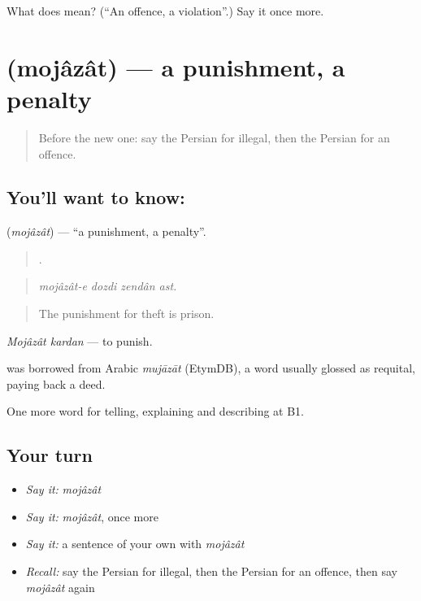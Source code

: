\begin{tcolorbox}[breakable,colback=teal!4,colframe=teal!35!black,title={Before you move on}]
What does  mean? (\textquotedblleft{}An offence, a violation\textquotedblright{}.) Say it once more.
\end{tcolorbox}
\section[\texorpdfstring{\fa{مجازات} (mojâzât)}{مجازات (mojâzât)}]{ (mojâzât) — a punishment, a penalty}

\label{lesson:FA-C405-mojazat}



\begin{quote}
Before the new one: say the Persian for illegal, then the Persian for an offence.
\end{quote}

\subsection*{You'll want to know: }
\textbf{} (\emph{mojâzât}) — \textquotedblleft{}a punishment, a penalty\textquotedblright{}.

\begin{quote}
   .
\end{quote}

\begin{quote}
\emph{mojâzât-e dozdi zendân ast.}
\end{quote}

\begin{quote}
The punishment for theft is prison.
\end{quote}

\emph{Mojâzât kardan} — to punish.

\begin{cousinweb}
\textbf{} was borrowed from Arabic \emph{mujāzāt} (EtymDB), a word usually glossed as requital, paying back a deed.
\end{cousinweb}

\begin{grammarlens}[title={What you've built}]
One more word for telling, explaining and describing at B1.
\end{grammarlens}

\subsection*{Your turn}
\begin{itemize}
\raggedright
  \item \emph{Say it:} \emph{mojâzât}
  \item \emph{Say it:} \emph{mojâzât}, once more
  \item \emph{Say it:} a sentence of your own with \emph{mojâzât}
  \item \emph{Recall:} say the Persian for illegal, then the Persian for an offence, then say \emph{mojâzât} again
\end{itemize}

